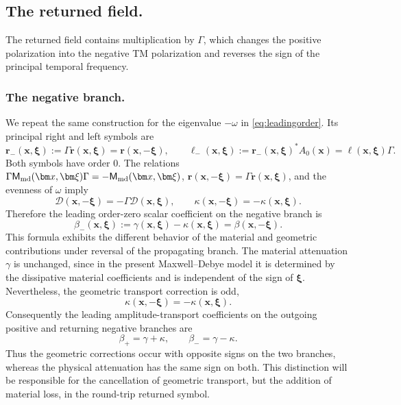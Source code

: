 \documentclass[11pt,reqno]{amsart}
\numberwithin{equation}{section}
\begin{document}
\subsection{The returned field.}

The returned field contains multiplication by $\Gamma$, which changes the positive polarization into the negative TM polarization and reverses the sign of the principal temporal frequency. 

\subsubsection{The negative branch.}
We repeat the same construction for the eigenvalue $-\omega$ in \eqref{eq:leadingorder}. Its principal right and left symbols are
\begin{equation*}
 \bm r_-(\bm x,\bm\xi):=\Gamma\bm r(\bm x,\bm\xi) = \bm r(\bm x,-\bm\xi),
 \qquad
 \bm\ell_-(\bm x,\bm\xi):=\bm r_-(\bm x,\bm\xi)^*A_0(\bm x) = \bm\ell(\bm x,\bm\xi)\Gamma.
\end{equation*}
Both symbols have order $0$. The relations
$\Gamma \mathsf M_{\rm md}(\bm x,\bm\xi)\Gamma=-\mathsf M_{\rm md}(\bm x,\bm\xi)$,
$\bm r(\bm x,-\bm\xi)=\Gamma\bm r(\bm x,\bm\xi)$, and the evenness of $\omega$ imply
$$
 \bm{\mathcal D}(\bm x,-\bm\xi)=-\Gamma\bm{\mathcal D}(\bm x,\bm\xi),
 \qquad
 \kappa(\bm x,-\bm\xi)=-\kappa(\bm x,\bm\xi).
$$
Therefore the leading order-zero scalar coefficient on the negative branch is
\begin{equation*}
 \beta_-(\bm x,\bm\xi):=\gamma(\bm x,\bm\xi)-\kappa(\bm x,\bm\xi)=\beta(\bm x,-\bm\xi).
\end{equation*}
This formula exhibits the different behavior of the material and geometric contributions under reversal of the propagating branch. The material attenuation $\gamma$ is unchanged, since in the present Maxwell--Debye model it is determined by the dissipative material coefficients and is independent of the sign of $\bm\xi$. Nevertheless, the geometric transport correction is odd,
$$
    \kappa(\bm x,-\bm\xi)=-\kappa(\bm x,\bm\xi).
$$
Consequently the leading amplitude-transport coefficients on the outgoing positive and returning negative branches are
\begin{equation*}
    \beta_+=\gamma+\kappa, \qquad \beta_-=\gamma-\kappa.
\end{equation*}
Thus the geometric corrections occur with opposite signs on the two branches, whereas the physical attenuation has the same sign on both. This distinction will be responsible for the cancellation of geometric transport, but the addition of material loss, in the round-trip returned symbol. 
\end{document}
